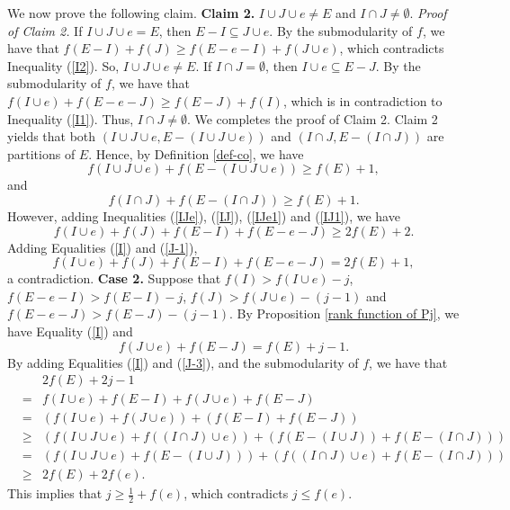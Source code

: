 \documentclass[preprint,10pt]{elsarticle}
\theoremstyle{plain}
\theoremstyle{definition}
\theoremstyle{remark}
\begin{document}
We now prove the following claim.
\vskip0.2cm
\noindent\textbf{Claim 2.} $I \cup J\cup e\neq E$ and $I \cap J\neq \emptyset$.
\vskip0.2cm
\noindent\emph{Proof of Claim 2.}
If $I \cup J\cup e=E$, then $ E-I\subseteq J\cup e$. By the submodularity of $f$, we have that $ f(E-I)+f(J)\geq f(E-e-I)+f(J\cup e)$, which contradicts Inequality (\ref{I2}). So, $I \cup J\cup e\neq E$. If $I \cap J=\emptyset$, then $I\cup e\subseteq E-J$. By the submodularity of $f$, we have that  $f(I\cup e)+f(E-e-J)\geq f(E-J)+f(I)$, which is in contradiction to Inequality (\ref{I1}). Thus,  $I \cap J\neq \emptyset$. We completes the proof of Claim 2.
 \vskip0.2cm
Claim 2 yields that both $(I \cup J\cup e,E-(I \cup J\cup e))$ and $(I \cap J,E-(I \cap J))$ are partitions of $E$. Hence, by Definition \ref{def-co}, we have
\begin{equation}\label{IJe1}
f(I \cup J\cup e) + f(E-(I \cup J\cup e)) \geq f(E)+1,
\end{equation}
and
\begin{equation}\label{IJ1}
f(I \cap J) + f(E-(I \cap J)) \geq f(E)+1.
\end{equation}
However, adding Inequalities (\ref{IJe}), (\ref{IJ}), (\ref{IJe1}) and (\ref{IJ1}), we have
\begin{equation*}
f(I\cup e) + f(J)+ f(E-I) + f(E-e-J)\geq 2f(E)+2.
\end{equation*}
Adding Equalities (\ref{I}) and (\ref{J-1}),
\begin{equation*}
f(I\cup e) + f(J)+ f(E-I) + f(E-e-J)=2f(E)+1,
\end{equation*}
a contradiction.
 \vskip0.2cm
\noindent\textbf{Case 2.}  Suppose that \(f(I)> f(I\cup e)-j\), \(f(E-e-I) > f(E-I)-j\), \(f(J) > f(J\cup e)-(j-1)\) and \(f(E-e-J) > f(E-J)-(j-1)\).
\vskip0.2cm
By Proposition \ref{rank function of Pj}, we have Equality (\ref{I}) and
\begin{equation}\label{J-3}
f(J \cup e) + f(E-J) = f(E)+j-1.
\end{equation}
By adding Equalities (\ref{I}) and (\ref{J-3}), and the submodularity of $f$, we have that
\begin{eqnarray*}
&&2f(E)+2j-1\\
&=& f(I \cup e) + f(E-I) +f(J \cup e) + f(E-J)\\
&=& (f(I \cup e) +f(J \cup e))+ (f(E-I) + f(E-J))\\
&\ge &(f(I \cup J \cup e) + f((I \cap J) \cup e)) + (f(E-(I \cup J)) + f(E-(I \cap J))) \\
&= &(f(I \cup J \cup e) + f(E-(I \cup J)))+(f((I \cap J) \cup e) + f(E-(I \cap J))) \\
&\ge &2f(E) + 2f(e).
\end{eqnarray*}
This implies that $j\ge \frac{1}{2}+f(e)$,  which  contradicts  $j\leq f(e)$.
\end{document}
